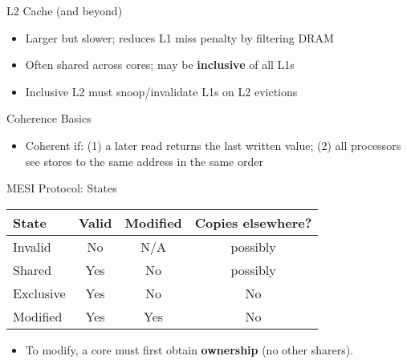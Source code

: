 \documentclass[aspectratio=169,12pt]{beamer}
\begin{document}
\begin{frame}{L2 Cache (and beyond)}
\begin{itemize}
  \item Larger but slower; reduces L1 miss penalty by filtering DRAM
  \item Often shared across cores; may be \textbf{inclusive} of all L1s
  \item Inclusive L2 must snoop/invalidate L1s on L2 evictions
\end{itemize}
\end{frame}

\begin{frame}{Coherence Basics}
\begin{itemize}
  \item Coherent if: (1) a later read returns the last written value; (2) all processors see stores to the same address in the same order
\end{itemize}
\end{frame}

\begin{frame}{MESI Protocol: States}
\begin{center}
\begin{tabular}{lccc}
\toprule
State & Valid & Modified & Copies elsewhere?\\
\midrule
Invalid   & No  & N/A  & possibly\\
Shared    & Yes & No   & possibly\\
Exclusive & Yes & No   & No\\
Modified  & Yes & Yes  & No\\
\bottomrule
\end{tabular}
\end{center}
\begin{itemize}
  \item To modify, a core must first obtain \textbf{ownership} (no other sharers).
\end{itemize}
\end{frame}
\end{document}
